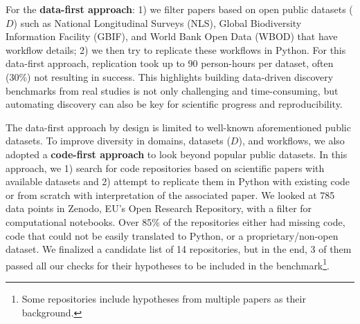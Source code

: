 For the \textbf{data-first approach}: 1) we filter papers based on open public datasets ($D$) such as National Longitudinal Surveys (NLS), Global Biodiversity Information Facility (GBIF), and World Bank Open Data (WBOD) that have workflow details; 2) we then try to replicate these workflows in Python. For this data-first approach, replication took up to 90 person-hours per dataset, often (30\%) not resulting in success. This highlights building data-driven discovery benchmarks from real studies is not only challenging and time-consuming, but automating discovery can also be key for scientific progress and reproducibility. 



The data-first approach by design is limited to well-known aforementioned public datasets. To improve diversity in domains, datasets ($D$), and workflows, we also adopted a \textbf{code-first approach} to look beyond popular public datasets. 
In this approach, we 1) search for code repositories based on scientific papers with available datasets and 2) attempt to replicate them in Python with existing code or from scratch with interpretation of the associated paper. We looked at 785 data points in Zenodo, EU's Open Research Repository, with a filter for computational notebooks. Over 85\% of the repositories either had missing code, code that could not be easily translated to Python, or a proprietary/non-open dataset. We finalized a candidate list of 14 repositories, but in the end, 3 of them passed all our checks for their hypotheses to be included in the benchmark\footnote{Some repositories include hypotheses from multiple papers as their background.}. 

